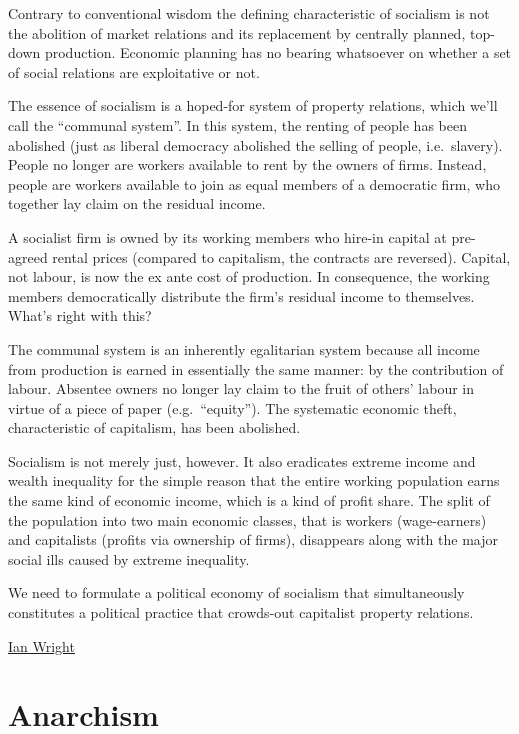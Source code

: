 \documentclass[
]{book}
\begin{document}
Contrary to conventional wisdom the defining characteristic of socialism is not the abolition of market relations and its replacement by centrally planned, top-down production. Economic planning has no bearing whatsoever on whether a set of social relations are exploitative or not.

The essence of socialism is a hoped-for system of property relations, which we'll call the ``communal system''. In this system, the renting of people has been abolished (just as liberal democracy abolished the selling of people, i.e.~slavery). People no longer are workers available to rent by the owners of firms. Instead, people are workers available to join as equal members of a democratic firm, who together lay claim on the residual income.

A socialist firm is owned by its working members who hire-in capital at pre-agreed rental prices (compared to capitalism, the contracts are reversed). Capital, not labour, is now the ex ante cost of production. In consequence, the working members democratically distribute the firm's residual income to themselves.
What's right with this?

The communal system is an inherently egalitarian system because all income from production is earned in essentially the same manner: by the contribution of labour. Absentee owners no longer lay claim to the fruit of others' labour in virtue of a piece of paper (e.g.~``equity''). The systematic economic theft, characteristic of capitalism, has been abolished.

Socialism is not merely just, however. It also eradicates extreme income and wealth inequality for the simple reason that the entire working population earns the same kind of economic income, which is a kind of profit share. The split of the population into two main economic classes, that is workers (wage-earners) and capitalists (profits via ownership of firms), disappears along with the major social ills caused by extreme inequality.

We need to formulate a political economy of socialism
that simultaneously constitutes a political practice
that crowds-out capitalist property relations.

\href{https://ianwrightsite.wordpress.com/2016/12/14/first-blog-post/}{Ian Wright}

\hypertarget{anarchism}{%
\chapter{Anarchism}\label{anarchism}}
\end{document}
